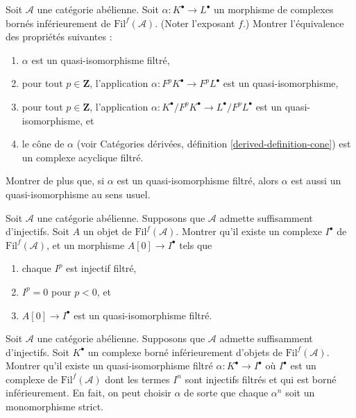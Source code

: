 \begin{exercise}
\label{exercise-filtered-quasi-isomorphism}
Soit $\mathcal{A}$ une catégorie abélienne.
Soit $\alpha : K^\bullet \to L^\bullet$ un morphisme de complexes bornés inférieurement
de $\text{Fil}^f(\mathcal{A})$. (Noter l'exposant $f$.)
Montrer l'équivalence des propriétés suivantes :
\begin{enumerate}
\item $\alpha$ est un quasi-isomorphisme filtré,
\item pour tout $p \in \mathbf{Z}$, l'application
$\alpha : F^pK^\bullet \to F^pL^\bullet$ est un quasi-isomorphisme,
\item pour tout $p \in \mathbf{Z}$, l'application
$\alpha : K^\bullet/F^pK^\bullet \to L^\bullet/F^pL^\bullet$
est un quasi-isomorphisme, et
\item le cône de $\alpha$ (voir
Catégories dérivées, définition \ref{derived-definition-cone})
est un complexe acyclique filtré.
\end{enumerate}
Montrer de plus que, si $\alpha$ est un quasi-isomorphisme filtré,
alors $\alpha$ est aussi un quasi-isomorphisme au sens usuel.
\end{exercise}

\begin{exercise}
\label{exercise-injective-resolution}
Soit $\mathcal{A}$ une catégorie abélienne.
Supposons que $\mathcal{A}$ admette suffisamment d'injectifs.
Soit $A$ un objet de $\text{Fil}^f(\mathcal{A})$.
Montrer qu'il existe un complexe
$I^\bullet$ de $\text{Fil}^f(\mathcal{A})$,
et un morphisme $A[0] \to I^\bullet$ tels que
\begin{enumerate}
\item chaque $I^p$ est injectif filtré,
\item $I^p = 0$ pour $p < 0$, et
\item $A[0] \to I^\bullet$ est un quasi-isomorphisme filtré.
\end{enumerate}
\end{exercise}

\begin{exercise}
\label{exercise-injective-resolution-complex}
Soit $\mathcal{A}$ une catégorie abélienne.
Supposons que $\mathcal{A}$ admette suffisamment d'injectifs.
Soit $K^\bullet$ un complexe borné inférieurement d'objets de
$\text{Fil}^f(\mathcal{A})$. Montrer qu'il existe un
quasi-isomorphisme filtré $\alpha : K^\bullet \to I^\bullet$
où $I^\bullet$ est un complexe de $\text{Fil}^f(\mathcal{A})$
dont les termes $I^n$ sont injectifs filtrés et qui est borné inférieurement.
En fait, on peut choisir $\alpha$ de sorte que chaque $\alpha^n$ soit
un monomorphisme strict.
\end{exercise}

